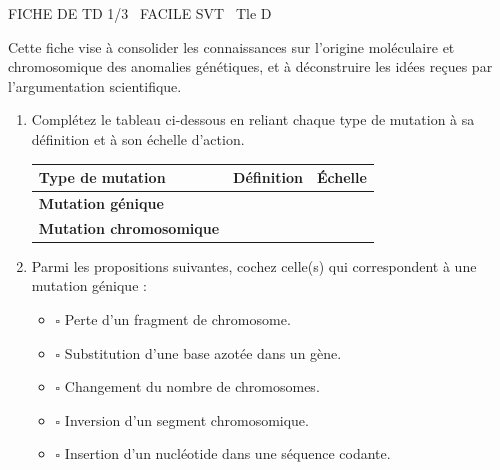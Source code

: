 \documentclass[11pt]{article}
\begin{document}
\begin{tcolorbox}[enhanced,colback=popink,colframe=popink,arc=10pt,boxrule=0pt,left=12pt,right=12pt,top=9pt,bottom=9pt]
{\color{white}\popxbold\small FICHE DE TD 1/3 \textbullet\ FACILE \hfill SVT \textbullet\ Tle D\par}
\end{tcolorbox}
\vspace{4pt}
Cette fiche vise à consolider les connaissances sur l'origine moléculaire et chromosomique des anomalies génétiques, et à déconstruire les idées reçues par l'argumentation scientifique.

\begin{exercice}
\begin{enumerate}
    \item Complétez le tableau ci-dessous en reliant chaque type de mutation à sa définition et à son échelle d'action.
    
    \begin{tabularx}{\linewidth}{>{\bfseries}l X X}
        \toprule
        \textbf{Type de mutation} & \textbf{Définition} & \textbf{Échelle} \\
        \midrule
        Mutation génique &  &  \\
        Mutation chromosomique &  &  \\
        \bottomrule
    \end{tabularx}
    
    \item Parmi les propositions suivantes, cochez celle(s) qui correspondent à une mutation génique :
    \begin{itemize}
        \item[] $\square$ Perte d'un fragment de chromosome.
        \item[] $\square$ Substitution d'une base azotée dans un gène.
        \item[] $\square$ Changement du nombre de chromosomes.
        \item[] $\square$ Inversion d'un segment chromosomique.
        \item[] $\square$ Insertion d'un nucléotide dans une séquence codante.
    \end{itemize}
\end{enumerate}
\end{exercice}
\end{document}
